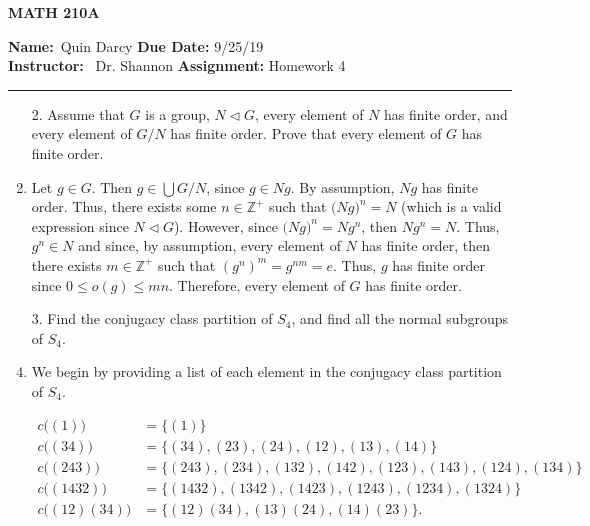 \documentclass[12pt]{article}
\makeatletter
\theoremstyle{definition}
\theoremstyle{remark}
\renewenvironment{proof}[1][\proofname]{\par
  \pushQED{\qed}%
  \normalfont \topsep6\p@\@plus6\p@\relax
  \list{}{\leftmargin=0mm
          \rightmargin=0mm
          \settowidth{\itemindent}{\itshape#1}%
          \labelwidth=\itemindent
          \parsep=0pt \listparindent=\parindent 
  }
  \item[\hskip\labelsep
        \itshape
    #1\@addpunct{.}]\ignorespaces
}{%
  \popQED\endlist\@endpefalse
}
\newenvironment{solution}[1][\bf{\textit{Solution}}]{\par
  
  \normalfont \topsep6\p@\@plus6\p@\relax
  \list{}{\leftmargin=0mm
          \rightmargin=0mm
          \settowidth{\itemindent}{\itshape#1}%
          \labelwidth=\itemindent
          \parsep=0pt \listparindent=\parindent 
  }
  \item[\hskip\labelsep
        \itshape
    #1\@addpunct{.}]\ignorespaces
}{%
  \popQED\endlist\@endpefalse
}
\let\oldproofname=\proofname
\renewcommand{\proofname}{\bf{\textit{\oldproofname}}}
\makeatother
\begin{document}
    \begin{center}
	    \vspace{.4cm} {\textbf { \large MATH 210A}}
    \end{center}
    {\textbf{Name:}\ Quin Darcy \hspace{\fill} \textbf{Due Date:} 9/25/19   \\
    { \textbf{Instructor:}} \ Dr. Shannon \hspace{\fill} \textbf{Assignment:} Homework 4 \\ \hrule}

    \justifying
    
    \begin{enumerate}[leftmargin=*]
        \item[2.] Assume that $G$ is a group, $N\triangleleft G$, every element of $N$ has finite order, and every element of $G/N$ has finite order. Prove that every element of $G$ has finite order.
            \begin{proof}
                Let $g\in G$. Then $g\in\bigcup G/N$, since $g\in Ng$. By assumption, $Ng$ has finite order. Thus, there exists some $n\in\mathbb{Z}^{+}$ such that $\big(Ng)^n=N$ (which is a valid expression since $N\triangleleft G$). However, since $\big(Ng)^n=Ng^n$, then $Ng^n=N$. Thus, $g^n\in N$ and since, by assumption, every element of $N$ has finite order, then there exists $m\in\mathbb{Z}^{+}$ such that $(g^n)^m=g^{nm}=e$. Thus, $g$ has finite order since $0\leq o(g)\leq mn$. Therefore, every element of $G$ has finite order.
            \end{proof}
            
        \item[3.] Find the conjugacy class partition of $S_4$, and find all the normal subgroups of $S_4$.
            \begin{solution}
                We begin by providing a list of each element in the conjugacy class partition of $S_4$.
                
                \begin{equation*}
                    \begin{split}
                        c\big((1)\big) &= \{(1)\} \\
                        c\big((34)\big) &= \{(34),(23),(24),(12),(13),(14)\}\\
                        c\big((243)\big) &= \{(243),(234),(132),(142),(123),(143),(124),(134)\}\\
                        c\big((1432)\big) &= \{(1432),(1342),(1423),(1243),(1234),(1324)\}\\
                        c\big((12)(34)\big) &= \{(12)(34),(13)(24),(14)(23)\}.
                    \end{split}
                \end{equation*}
                

\end{solution}
\end{enumerate}
\end{document}
